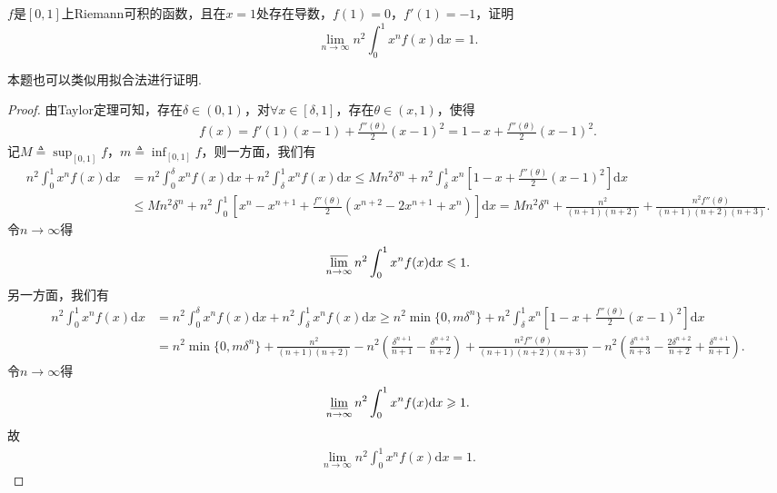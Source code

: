 \documentclass[../../main.tex]{subfiles}
\begin{document}
\begin{example}
$f$是$[0,1]$上Riemann可积的函数，且在$x=1$处存在导数，$f(1)=0$，$f'(1)=-1$，证明$$\lim\limits_{n \to \infty} n^2 \int_0^1 x^n f(x) \mathrm{d}x = 1.$$
\end{example}
\begin{note}
本题也可以类似用拟合法进行证明.
\end{note}
\begin{proof}
由Taylor定理可知，存在$\delta \in (0,1)$，对$\forall x\in [\delta,1]$，存在$\theta \in (x,1)$，使得
\begin{align*}
f(x) = f'(1)(x-1) + \frac{f''(\theta)}{2}(x-1)^2 = 1 - x + \frac{f''(\theta)}{2}(x-1)^2.
\end{align*}
记$M \triangleq \sup_{[0,1]}f$，$m \triangleq \inf_{[0,1]}f$，则一方面，我们有
\begin{align*}
n^2\int_0^1 x^n f(x) \mathrm{d}x &= n^2\int_0^\delta x^n f(x) \mathrm{d}x + n^2\int_\delta^1 x^n f(x) \mathrm{d}x \leqslant Mn^2\delta^n + n^2\int_\delta^1 x^n \left[1 - x + \frac{f''(\theta)}{2}(x - 1)^2\right] \mathrm{d}x \\
&\leqslant Mn^2\delta^n + n^2\int_0^1 \left[x^n - x^{n+1} + \frac{f''(\theta)}{2}(x^{n+2} - 2x^{n+1} + x^n)\right] \mathrm{d}x = Mn^2\delta^n + \frac{n^2}{(n+1)(n+2)} + \frac{n^2 f''(\theta)}{(n+1)(n+2)(n+3)}.
\end{align*}
令$n \to \infty$得
\begin{align*}
\varlimsup_{n \to \infty} n^2\int_0^1 x^n f(x) \mathrm{d}x \leqslant 1.
\end{align*}
另一方面，我们有
\begin{align*}
n^2\int_0^1 x^n f(x) \mathrm{d}x &= n^2\int_0^\delta x^n f(x) \mathrm{d}x + n^2\int_\delta^1 x^n f(x) \mathrm{d}x \geqslant n^2\min\{0, m\delta^n\} + n^2\int_\delta^1 x^n \left[1 - x + \frac{f''(\theta)}{2}(x - 1)^2\right] \mathrm{d}x \\
&= n^2\min\{0, m\delta^n\} + \frac{n^2}{(n+1)(n+2)} - n^2\left(\frac{\delta^{n+1}}{n+1} - \frac{\delta^{n+2}}{n+2}\right) + \frac{n^2 f''(\theta)}{(n+1)(n+2)(n+3)} - n^2\left(\frac{\delta^{n+3}}{n+3} - \frac{2\delta^{n+2}}{n+2} + \frac{\delta^{n+1}}{n+1}\right).
\end{align*}
令$n \to \infty$得
\begin{align*}
\varliminf_{n \to \infty} n^2\int_0^1 x^n f(x) \mathrm{d}x \geqslant 1.
\end{align*}
故
\begin{align*}
\lim_{n \to \infty} n^2\int_0^1 x^n f(x) \mathrm{d}x = 1.
\end{align*}
\end{proof}
\end{document}

